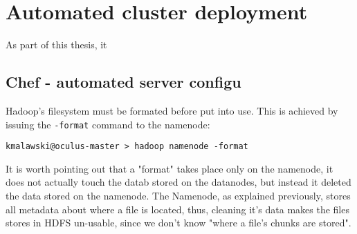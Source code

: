 \chapter{Automated cluster deployment}
As part of this thesis, it 

\section{Chef - automated server configu}

Hadoop's filesystem must be formated before put into use. This is achieved by issuing the \verb|-format| command to the namenode:

\begin{verbatim}
kmalawski@oculus-master > hadoop namenode -format
\end{verbatim}

It is worth pointing out that a "format" takes place only on the namenode, it does not actually touch the datab stored on the datanodes,
but instead it deleted the data stored on the namenode. The Namenode, as explained previously, stores all metadata about where a file is located,
thus, cleaning it's data makes the files stores in HDFS un-usable, since we don't know "where a file's chunks are stored".
